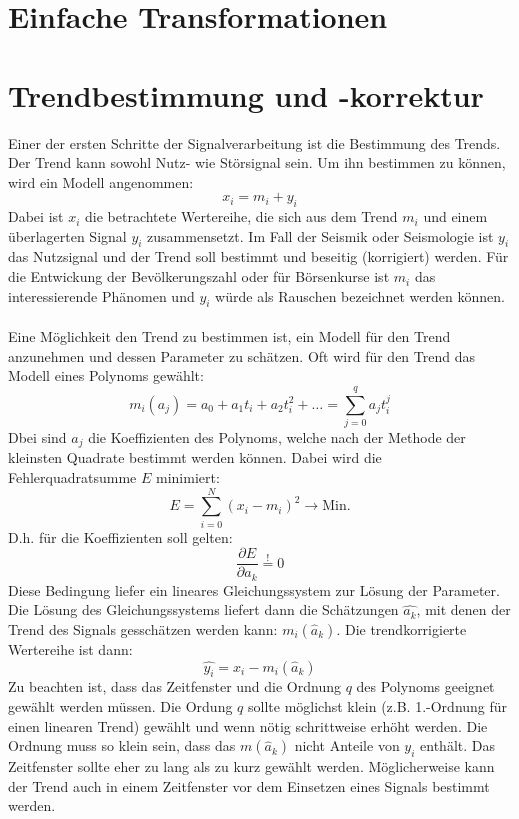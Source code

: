 \section{Einfache Transformationen}

\section{Trendbestimmung und -korrektur}
Einer der ersten Schritte der Signalverarbeitung ist die Bestimmung des Trends. Der Trend kann sowohl Nutz- wie Störsignal sein. Um ihn bestimmen zu können, wird ein Modell angenommen:
\[
x_i=m_i + y_i
\]
Dabei ist $x_i$ die betrachtete Wertereihe, die sich aus dem Trend $m_i$ und einem überlagerten Signal $y_i$ zusammensetzt. Im Fall der Seismik oder Seismologie ist ${y_i}$ das Nutzsignal und der Trend soll bestimmt und beseitig (korrigiert) werden. Für die Entwickung der Bevölkerungszahl oder für Börsenkurse ist ${m_i}$ das interessierende Phänomen und ${y_i}$ würde als Rauschen bezeichnet werden können.\\\\
Eine Möglichkeit den Trend zu bestimmen ist, ein Modell für den Trend anzunehmen und dessen Parameter zu schätzen. Oft wird für den Trend das Modell eines Polynoms gewählt:
\[
m_i(a_j)=a_0+ a_1t_i+a_2t_i^2+\dots = \sum\limits_{j=0}^{q} a_j t_i^j
\]
Dbei sind ${a_j}$ die Koeffizienten des Polynoms, welche nach der Methode der kleinsten Quadrate bestimmt werden können. Dabei wird die Fehlerquadratsumme $E$ minimiert:
\[
E=\sum\limits_{i=0}^N (x_i -m_i)^2 \rightarrow \mbox{Min.}
\]
D.h. für die Koeffizienten soll gelten:
\[
\frac{\partial E}{\partial a_k}\stackrel{!}{=}0
\]
Diese Bedingung liefer ein lineares Gleichungssystem zur Lösung der Parameter. Die Lösung des Gleichungssystems liefert dann die Schätzungen $\hat{a_k}$, mit denen der Trend des Signals gesschätzen werden kann: $m_i(\hat a_k)$. Die trendkorrigierte Wertereihe ist dann:
\[
\hat{y_i}=x_i-m_i(\hat a_k)
\]
Zu beachten ist, dass das Zeitfenster und die Ordnung $q$ des Polynoms geeignet gewählt werden müssen. Die Ordung $q$ sollte möglichst klein (z.B. 1.-Ordnung für einen linearen Trend) gewählt und wenn nötig schrittweise erhöht werden. Die Ordnung muss so klein sein, dass das $m(\hat a_k)$ nicht Anteile von ${y_i}$ enthält. Das Zeitfenster sollte eher zu lang als zu kurz gewählt werden. Möglicherweise kann der Trend auch in einem Zeitfenster vor dem Einsetzen eines Signals bestimmt werden.\\\\

